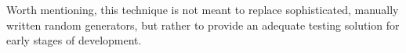 \documentclass[sigconf, anonymous, review]{acmart}
\newcommand{\fuzzchick}{\textit{FuzzChick}\xspace}
\begin{document}
Worth mentioning, this technique is not meant to replace sophisticated, manually
written random generators, but rather to provide an adequate testing solution
for early stages of development.


\end{document}
